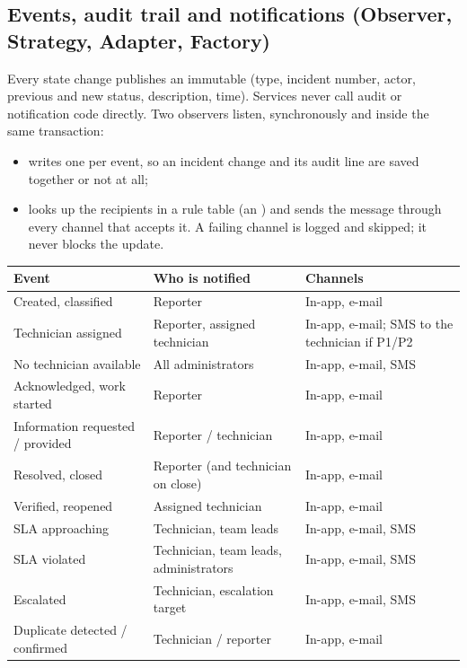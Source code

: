 \subsection{Events, audit trail and notifications (Observer, Strategy, Adapter, Factory)}
Every state change publishes an immutable  (type, incident number, actor, previous and new status, description, time). Services never call audit or notification code directly. Two observers listen, synchronously and inside the same transaction:
\begin{itemize}
  \item {} writes one  per event, so an incident change and its audit line are saved together or not at all;
  \item {} looks up the recipients in a rule table (an ) and sends the message through every channel that accepts it. A failing channel is logged and skipped; it never blocks the update.
\end{itemize}

\begin{longtable}{@{}L{4.4cm}L{5.4cm}L{5.4cm}@{}}
\toprule
\textbf{Event} & \textbf{Who is notified} & \textbf{Channels} \\
\midrule\endhead
Created, classified & Reporter & In-app, e-mail \\
Technician assigned & Reporter, assigned technician & In-app, e-mail; SMS to the technician if P1/P2 \\
No technician available & All administrators & In-app, e-mail, SMS \\
Acknowledged, work started & Reporter & In-app, e-mail \\
Information requested / provided & Reporter / technician & In-app, e-mail \\
Resolved, closed & Reporter (and technician on close) & In-app, e-mail \\
Verified, reopened & Assigned technician & In-app, e-mail \\
SLA approaching & Technician, team leads & In-app, e-mail, SMS \\
SLA violated & Technician, team leads, administrators & In-app, e-mail, SMS \\
Escalated & Technician, escalation target & In-app, e-mail, SMS \\
Duplicate detected / confirmed & Technician / reporter & In-app, e-mail \\
\bottomrule
\end{longtable}

